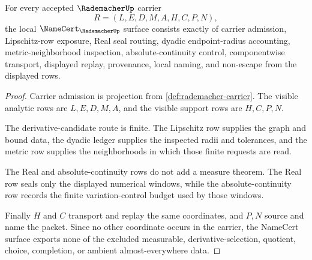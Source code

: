 \begin{theorem}
\label{thm:rademacher-namecert-obligations}
For every accepted $\RademacherUp$ carrier
$$
R=(L,E,D,M,A,H,C,P,N),
$$
the local $\NameCert_{\RademacherUp}$ surface consists exactly of carrier admission, Lipschitz-row exposure, Real seal routing, dyadic endpoint-radius accounting, metric-neighborhood inspection, absolute-continuity control, componentwise transport, displayed replay, provenance, local naming, and non-escape from the displayed rows.
\end{theorem}
\begin{proof}
Carrier admission is projection from \autoref{def:rademacher-carrier}. The visible analytic rows are $L,E,D,M,A$, and the visible support rows are $H,C,P,N$.

The derivative-candidate route is finite. The Lipschitz row supplies the graph and bound data, the dyadic ledger supplies the inspected radii and tolerances, and the metric row supplies the neighborhoods in which those finite requests are read.

The Real and absolute-continuity rows do not add a measure theorem. The Real row seals only the displayed numerical windows, while the absolute-continuity row records the finite variation-control budget used by those windows.

Finally $H$ and $C$ transport and replay the same coordinates, and $P,N$ source and name the packet. Since no other coordinate occurs in the carrier, the NameCert surface exports none of the excluded measurable, derivative-selection, quotient, choice, completion, or ambient almost-everywhere data.
\end{proof}

